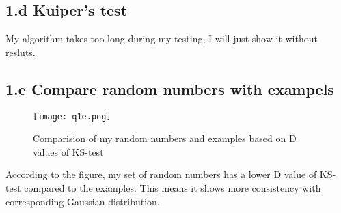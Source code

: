 \subsection{1.d Kuiper's test}

My algorithm takes too long during my testing, I will just show it without resluts.

\subsection{1.e Compare random numbers with exampels}


\begin{figure}[h!]
  \centering
  \texttt{[image: q1e.png]}
  \caption{Comparision of my random numbers and examples based on D values of KS-test}
  \label{fig:comparision}
\end{figure}
According to the figure, my set of random numbers has a lower D value of KS-test compared to the examples.
This means it shows more consistency with corresponding Gaussian distribution.